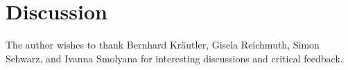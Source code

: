 \documentclass[english,submission]{programming}
\begin{document}






\section{Discussion}
\label{sec:discussion}




\acks
The author wishes to thank Bernhard Kräutler, Gisela Reichmuth, Simon Schwarz, and Ivanna Smolyana for interesting discussions and critical feedback.


\newpage
\appendix








\printbibliography
\end{document}
